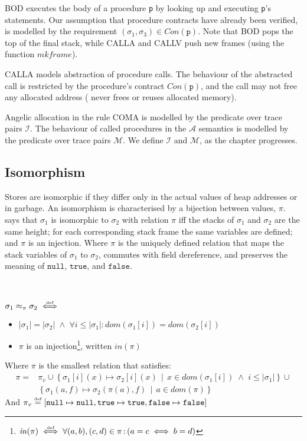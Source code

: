 \documentclass[runningheads,a4paper]{llncs}
\DeclareMathOperator{\band}{\bm{\;\land\;}}
\DeclareMathOperator{\suchthat}{:}
\newcommand*{\domain}[1]{\mathit{dom}(#1)}
\newcommand*{\cardinality}[1]{\left|{#1}\right|}
\newcommand*{\defeq}{\stackrel{\text{\tiny def}}{=}}
\newcommand*{\defiff}{\stackrel{\text{\tiny def}}{\iff}}
\newcommand*{\setcomp}[2]{\left\{#1\,\middle|\,#2\right\}}
\newcommand*{\nullv}{\texttt{null}}
\newcommand*{\truev}{\texttt{true}}
\newcommand*{\falsev}{\texttt{false}}
\newcommand*{\Contract}{\mathit{Con}}
\newcommand*\iso{\approx}
\newcommand*\Asemantics{\mathcal{A}}
\newcommand*\asemantics{$\Asemantics$ semantics}
\newcommand*{\callRuleAbstract}{\textnormal{CALLA}}
\newcommand*{\composeRuleAbstract}{\textnormal{COMA}}
\newcommand*{\callRuleConcrete}{\textnormal{CALLV}}
\newcommand*{\callRuleVerified}{\callRuleConcrete{}}
\newcommand*{\bodyRule}{\textnormal{BOD}}
\newcommand*{\fun}{\texttt{p}}
\newcommand*{\mkframe}{\mathit{mkframe}}
\newcommand*{\bijection}[1]{\mathit{in}{\left(#1\right)}}
\newcommand*{\isoR}{\mathcal{I}}
\newcommand*{\mutR}{\mathcal{M}}
\newcommand*{\store}{\sigma}
\begin{document}
\bodyRule{} executes the body of a procedure \texttt{\fun} by looking up and executing \texttt{\fun}'s statements. Our assumption that procedure contracts have already been verified, is modelled by the requirement $(\store_1,\store_3) \in \Contract(\fun)$. Note that \bodyRule{} pops the top of the final stack, while \callRuleAbstract{} and \callRuleVerified{} push new frames (using the function $\mkframe$).

\callRuleAbstract{} models abstraction of procedure calls. The behaviour of the abstracted call is restricted by the procedure's contract $\Contract(\fun)$, and the call may not free any allocated address (\lang{} never frees or reuses allocated memory).

Angelic allocation in the rule \composeRuleAbstract{} is modelled by the predicate over trace pairs $\isoR$. The behaviour of called procedures in the \asemantics{} is modelled by the predicate over trace pairs $\mutR$. We define $\isoR$ and $\mutR$, as the chapter progresses.

\subsection{Isomorphism}

Stores are isomorphic if they differ only in the actual values of heap addresses or in garbage. An isomorphism is characterised by a bijection between values, $\pi$.  says that $\store_1$ is isomorphic to $\store_2$ with relation $\pi$ iff the stacks of $\store_1$ and $\store_2$ are the same height; for each corresponding stack frame the same variables are defined; and $\pi$ is an injection. Where $\pi$ is the uniquely defined relation that maps the stack variables of $\store_1$ to $\store_2$, commutes with field dereference, and preserves the meaning of $\nullv$, $\truev$, and $\falsev$.

\newcommand*{\piv}{\pi_v}
\begin{definition}[Isomorphism]\label{def:global isomorphism}\setlength{\parindent}{0cm}~

	$\store_1\iso_\pi\store_2 \defiff$
	\begin{itemize}
		\item $\cardinality{\store_1} = \cardinality{\store_2} \band \forall i \le \cardinality{\store_1} \suchthat\domain{\store_1[i]} = \domain{\store_2[i]}$
		\item $\pi$ is an injection\footnote{$\bijection{\pi} \defiff \forall (a,b), (c,d) \in \pi \suchthat \left(a=c \iff b=d\right)$}, written $\bijection{\pi}$
	\end{itemize}

	Where $\pi$ is the smallest relation that satisfies:
		\[\begin{aligned}
		   \pi = &\piv \cup
		   \setcomp{\store_1[i](x)\mapsto\store_2[i](x)}{x \in \domain{\store_1[i]} \band i \le \cardinality{\store_1}} \cup \\
		   &\setcomp{\store_1(a,f)\mapsto\store_2(\pi(a),f)}{a \in \domain{\pi}}
		\end{aligned}\]
	And $\piv \defeq [\nullv\mapsto\nullv, \truev\mapsto\truev, \falsev\mapsto\falsev]$
\end{definition}
\end{document}
